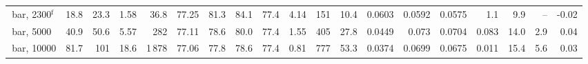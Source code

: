 \begin{table}[H]
{\begin{tabular}{l r r r r r r r r r r r r r r r r r r}
\LNtwo 3\,bar, 2300$^{\mathrm{f}}$ & 18.8 & 23.3 & 1.58 & 36.8 & 77.25 & 81.3 & 84.1 & 77.4 & 4.14 & 151 & 10.4 & 0.0603 & 0.0592 & 0.0575 & 1.1 & 9.9 & -- & -0.02 \\
\LNtwo 3\,bar, 5000 & 40.9 & 50.6 & 5.57 & 282 & 77.11 & 78.6 & 80.0 & 77.4 & 1.55 & 405 & 27.8 & 0.0449 & 0.073 & 0.0704 & 0.083 & 14.0 & 2.9 & 0.04 \\
\LNtwo 3\,bar, 10000 & 81.7 & 101 & 18.6 & 1\,878 & 77.06 & 77.8 & 78.6 & 77.4 & 0.81 & 777 & 53.3 & 0.0374 & 0.0699 & 0.0675 & 0.011 & 15.4 & 5.6 & 0.03 \\
\bottomrule
\end{tabular}}
\end{table}
